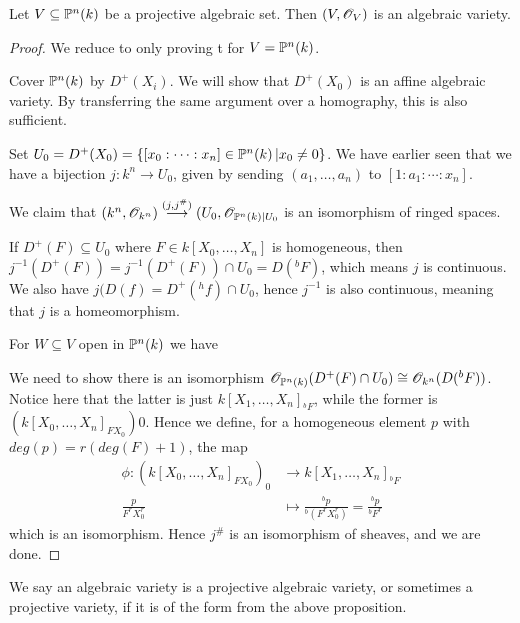 \begin{proposition}
Let $V\subseteq \P^n(k)$ be a projective algebraic set. Then $(V, \O_V)$ is an algebraic variety. 
\end{proposition}
\begin{proof}
We reduce to only proving t for $V=\P^n(k)$. 

Cover $\P^n(k)$ by $D^+(X_i)$. We will show that $D^+(X_0)$ is an affine algebraic variety. By transferring the same argument over a homography, this is also sufficient. 

Set $U_0 = D^+(X_0)=\{ [x_0:\cdots :x_n]\in \P^n(k) \,\vert x_0\neq 0 \}$. We have earlier seen that we have a bijection $j\colon k^n\longrightarrow U_0$, given by sending $(a_1, \ldots, a_n)$ to $[1:a_1:\cdots :x_n]$. 

We claim that $(k^n, \O_{k^n})\overset{(j, j^\#)}\longrightarrow (U_0, \O_{\P^n(k)\vert U_0}$ is an isomorphism of ringed spaces.

If $D^+(F)\subseteq U_0$ where $F\in k[X_0, \ldots, X_n]$ is homogeneous, then $j^{-1}(D^+(F))=j^{-1}(D^+(F))\cap U_0 = D(^bF)$, which means $j$ is continuous. We also have $j(D(f)=D^+(^h f)\cap U_0$, hence $j^{-1}$ is also continuous, meaning that $j$ is a homeomorphism. 

For $W\subseteq V$ open in $\P^n(k)$ we have 
\begin{center}
\end{center}

We need to show there is an isomorphism $\O_{\P^n(k)}(D^+(F)\cap U_0)\cong \O_{k^n}(D(^bF))$. Notice here that the latter is just $k[X_1, \ldots, X_n]_{^b F}$, while the former is $(k[X_0, \ldots, X_n]_{FX_0})0$. Hence we define, for a homogeneous element $p$ with $deg(p)=r (deg(F) +1)$, the map
\begin{align*}
    \phi\colon (k[X_0, \ldots, X_n]_{FX_0})_0 
    &\longrightarrow k[X_1, \ldots, X_n]_{^b F} \\
    \frac{p}{F^rX_0^r}
    &\longmapsto \frac{^b p}{^b(F^r X_0^r)} = \frac{^b p}{^b F^r}
\end{align*}
which is an isomorphism. Hence $j^\#$ is an isomorphism of sheaves, and we are done.
\end{proof}

We say an algebraic variety is a projective algebraic variety, or sometimes a projective variety, if it is of the form from the above proposition. 
